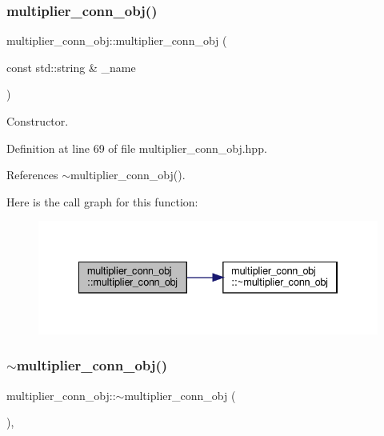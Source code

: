 \subsubsection{\texorpdfstring{multiplier\+\_\+conn\+\_\+obj()}{multiplier\_conn\_obj()}}
{\footnotesize\ttfamily multiplier\+\_\+conn\+\_\+obj\+::multiplier\+\_\+conn\+\_\+obj (\begin{DoxyParamCaption}\item[{const std\+::string \&}]{\+\_\+name }\end{DoxyParamCaption})\hspace{0.3cm}{\ttfamily [inline]}}



Constructor. 



Definition at line 69 of file multiplier\+\_\+conn\+\_\+obj.\+hpp.



References $\sim$multiplier\+\_\+conn\+\_\+obj().

Here is the call graph for this function\+:
\nopagebreak
\begin{figure}[H]
\begin{center}
\leavevmode
\includegraphics[width=334pt]{db/ddc/classmultiplier__conn__obj_a2a8dd975d60b62c0d5edb3ff408608ef_cgraph}
\end{center}
\end{figure}
\mbox{\label{classmultiplier__conn__obj_a8cad7eb5d13aea13f8b82610713f996d}} 
\subsubsection{\texorpdfstring{$\sim$multiplier\+\_\+conn\+\_\+obj()}{~multiplier\_conn\_obj()}}
{\footnotesize\ttfamily multiplier\+\_\+conn\+\_\+obj\+::$\sim$multiplier\+\_\+conn\+\_\+obj (\begin{DoxyParamCaption}{ }\end{DoxyParamCaption})\hspace{0.3cm}{\ttfamily [override]}, {\ttfamily [default]}}



